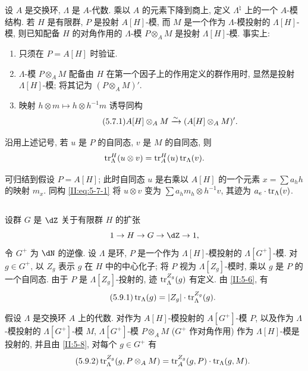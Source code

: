 设 $A$ 是交换环, $\Lambda$ 是 $A$-代数. 乘以 $A$ 的元素下降到商上, 定义 $\Lambda^\natural$ 上的一个 $A$-模结构. 若 $H$ 是有限群, $P$ 是投射 $A[H]$-模, 而 $M$ 是一个作为 $\Lambda$-模投射的 $\Lambda[H]$-模, 则已知配备 $H$ 的对角作用的 $\Lambda$-模 $P\otimes_A M$ 是投射 $\Lambda[H]$-模. 事实上:
\begin{enumerate}[\indent a)]
  \item 只须在 $P=A[H]$ 时验证.
  \item $\Lambda$-模 $P\otimes_A M$ 配备由 $H$ 在第一个因子上的作用定义的群作用时, 显然是投射 $\Lambda[H]$-模; 将其记为 $(P\otimes_A M)'$.
  \item 映射 $h\otimes m\mapsto h\otimes h^{-1} m$ 诱导同构
    \begin{equation*}\tag{5.7.1}\label{II:eq:5-7-1}
      A[H]\otimes_A M \xrightarrow\sim (A[H]\otimes_A M)' \text{.}
    \end{equation*}
\end{enumerate}

\begin{proposition_}\label{II:5-8}
沿用上述记号, 若 $u$ 是 $P$ 的自同态, $v$ 是 $M$ 的自同态, 则
\[
  \operatorname{tr}_\Lambda^H(u\otimes v) = \operatorname{tr}_A^H(u)\operatorname{tr}_\Lambda(v) \text{.}
\]
\end{proposition_}

可归结到假设 $P=A[H]$; 此时自同态 $u$ 是右乘以 $A[H]$ 的一个元素 $x=\sum a_h h$ 的映射 $m_x$. 同构 \eqref{II:eq:5-7-1} 将 $u\otimes v$ 变为 $\sum a_h m_h\otimes h^{-1} v$, 其迹为 $a_e\cdot\operatorname{tr}_\Lambda(v)$.

\subsection{}\label{II:5-9}

设群 $G$ 是 $\dZ$ 关于有限群 $H$ 的扩张
\[
  1 \to H \to G \to \dZ \to 1 \text{,}
\]
令 $G^+$ 为 $\dN$ 的逆像. 设 $\Lambda$ 是环, $P$ 是一个作为 $\Lambda[H]$-模投射的 $\Lambda[G^+]$-模. 对 $g\in G^+$, 以 $Z_g$ 表示 $g$ 在 $H$ 中的中心化子; 将 $P$ 视为 $\Lambda[Z_g]$-模时, 乘以 $g$ 是 $P$ 的一个自同态. 由于 $P$ 是 $\Lambda[Z_g]$-投射的, 迹 $\operatorname{tr}_\Lambda^{Z_g}(g)$ 有定义. 由 \ref{II:5-6}, 有
\begin{equation*}\tag{5.9.1}\label{II:eq:5-9-1}
  \operatorname{tr}_\Lambda(g) = |Z_g| \cdot \operatorname{tr}_\Lambda^{Z_g}(g) \text{.}
\end{equation*}

假设 $\Lambda$ 是交换环 $A$ 上的代数. 对作为 $A[H]$-模投射的 $A[G^+]$-模 $P$, 以及作为 $\Lambda$-模投射的 $\Lambda[G^+]$-模 $M$, $\Lambda[G^+]$-模 $P\otimes_A M$ ($G^+$ 作对角作用) 作为 $\Lambda[H]$-模是投射的, 并且由 \ref{II:5-8}, 对每个 $g\in G^+$ 有
\begin{equation*}\tag{5.9.2}\label{II:eq:5-9-2}
  \operatorname{tr}_\Lambda^{Z_g}(g,P\otimes_A M) = \operatorname{tr}_A^{Z_g}(g,P) \cdot \operatorname{tr}_\Lambda(g,M) \text{.}
\end{equation*}

